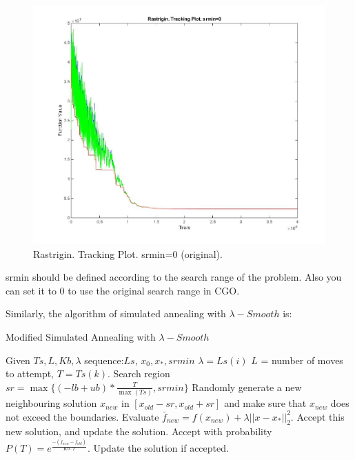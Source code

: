 \documentclass[letterpaper,12pt,titlepage,oneside,final]{book}
\begin{document}
\begin{figure}[H]
\includegraphics[scale=0.5]{srmin2.jpg}
\caption{Rastrigin. Tracking Plot. srmin=0 (original).}
\end{figure}

srmin should be defined according to the search range of the problem. Also you can set it to 0 to use the original search range in CGO.

Similarly, the algorithm of simulated annealing with $\lambda-Smooth$ is:

\begin{algorithm} [H]
\caption{Modified Simulated Annealing with $\lambda-Smooth$}
\begin{algorithmic} 
\STATE Given $Ts, L, Kb, \lambda$ sequence:$Ls$, $x_0, x_*, srmin$
\STATE $\lambda=Ls(i)$
\STATE $L$ = number of moves to attempt, $T= Ts(k)$.
\STATE Search region $sr=\max\{(-lb+ub)*\frac{T}{\max(Ts)},srmin\}$
\STATE Randomly generate a new neighbouring solution $x_{new}$ in $[x_{old}-sr,x_{old}+sr]$ and make sure that $x_{new}$ does not exceed the boundaries.
\STATE Evaluate $\bar{f}_{new}=f(x_{new})+\lambda||x-x_*||_2^2$.
\STATE Accept this new solution, and update the solution. 
\ELSE 
\STATE Accept with probability $P(T) = e^{\frac{-(\bar{f}_{new}-\bar{f}_{old})}{Kb\cdot T} }$. 
\STATE  Update the solution if accepted.
\ENDIF
\ENDFOR
\ENDFOR
\ENDFOR
\end{algorithmic}
\end{algorithm}
\end{document}
